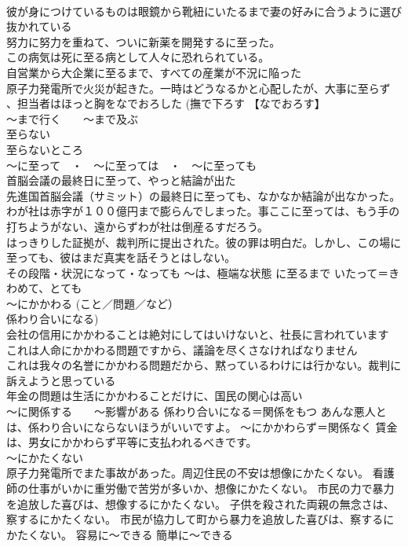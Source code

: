 \documentclass[8pt]{extreport}
\begin{document}
\begin{CJK}{UTF8}{min}
\\	彼が身につけているものは眼鏡から靴紐にいたるまで妻の好みに合うように選び抜かれている
\\	努力に努力を重ねて、ついに新薬を開発するに至った。 
\\	この病気は死に至る病として人々に恐れられている。 
\\	自営業から大企業に至るまで、すべての産業が不況に陥った 
\\	原子力発電所で火災が起きた。一時はどうなるかと心配したが、大事に至らず
\\	、担当者はほっと胸をなでおろした (撫で下ろす 【なでおろす】 
\\	～まで行く　　～まで及ぶ 
\\	至らない 
\\	至らないところ　
\\	～に至って　・　～に至っては　・　～に至っても	
\\	首脳会議の最終日に至って、やっと結論が出た
\\	先進国首脳会議（サミット）の最終日に至っても、なかなか結論が出なかった。 
\\	わが社は赤字が１００億円まで膨らんでしまった。事ここに至っては、もう手の打ちようがない、遠からずわが社は倒産るすだろう。 
\\	はっきりした証拠が、裁判所に提出された。彼の罪は明白だ。しかし、この場に至っても、彼はまだ真実を話そうとはしない。 
\\	その段階・状況になって・なっても ～は、極端な状態	に至るまで いたって＝きわめて、とても
\\	～にかかわる (こと／問題／など） 　
\\	係わり合いになる)	
\\	会社の信用にかかわることは絶対にしてはいけないと、社長に言われています 
\\	これは人命にかかわる問題ですから、議論を尽くさなければなりません 
\\	これは我々の名誉にかかわる問題だから、黙っているわけには行かない。裁判に訴えようと思っている 
\\	年金の問題は生活にかかわることだけに、国民の関心は高い 
\\	～に関係する　　～影響がある	係わり合いになる＝関係をもつ あんな悪人とは、係わり合いにならないほうがいいですよ。 ～にかかわらず＝関係なく 賃金は、男女にかかわらず平等に支払われるべきです。
\\	～にかたくない 
\\	原子力発電所でまた事故があった。周辺住民の不安は想像にかたくない。 看護師の仕事がいかに重労働で苦労が多いか、想像にかたくない。 市民の力で暴力を追放した喜びは、想像するにかたくない。 子供を殺された両親の無念さは、察するにかたくない。 市民が協力して町から暴力を追放した喜びは、察するにかたくない。	容易に～できる 簡単に～できる 

\end{CJK}
\end{document}
